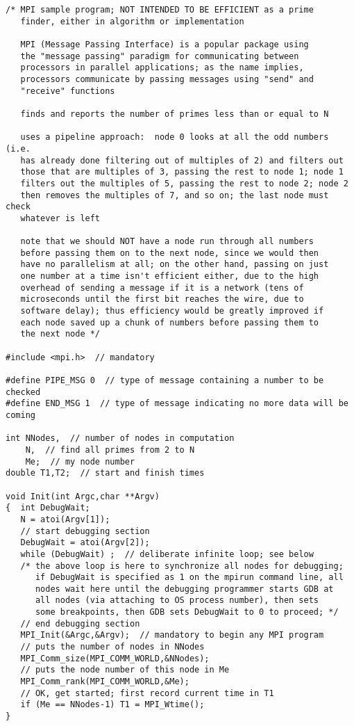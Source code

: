 \begin{Verbatim}
/* MPI sample program; NOT INTENDED TO BE EFFICIENT as a prime
   finder, either in algorithm or implementation

   MPI (Message Passing Interface) is a popular package using
   the "message passing" paradigm for communicating between
   processors in parallel applications; as the name implies,
   processors communicate by passing messages using "send" and
   "receive" functions

   finds and reports the number of primes less than or equal to N

   uses a pipeline approach:  node 0 looks at all the odd numbers (i.e.
   has already done filtering out of multiples of 2) and filters out
   those that are multiples of 3, passing the rest to node 1; node 1
   filters out the multiples of 5, passing the rest to node 2; node 2
   then removes the multiples of 7, and so on; the last node must check
   whatever is left

   note that we should NOT have a node run through all numbers
   before passing them on to the next node, since we would then
   have no parallelism at all; on the other hand, passing on just
   one number at a time isn't efficient either, due to the high
   overhead of sending a message if it is a network (tens of
   microseconds until the first bit reaches the wire, due to
   software delay); thus efficiency would be greatly improved if
   each node saved up a chunk of numbers before passing them to
   the next node */

#include <mpi.h>  // mandatory

#define PIPE_MSG 0  // type of message containing a number to be checked
#define END_MSG 1  // type of message indicating no more data will be coming

int NNodes,  // number of nodes in computation
    N,  // find all primes from 2 to N
    Me;  // my node number
double T1,T2;  // start and finish times

void Init(int Argc,char **Argv)
{  int DebugWait;
   N = atoi(Argv[1]);
   // start debugging section
   DebugWait = atoi(Argv[2]);
   while (DebugWait) ;  // deliberate infinite loop; see below
   /* the above loop is here to synchronize all nodes for debugging;
      if DebugWait is specified as 1 on the mpirun command line, all
      nodes wait here until the debugging programmer starts GDB at
      all nodes (via attaching to OS process number), then sets
      some breakpoints, then GDB sets DebugWait to 0 to proceed; */
   // end debugging section
   MPI_Init(&Argc,&Argv);  // mandatory to begin any MPI program
   // puts the number of nodes in NNodes
   MPI_Comm_size(MPI_COMM_WORLD,&NNodes);
   // puts the node number of this node in Me
   MPI_Comm_rank(MPI_COMM_WORLD,&Me);
   // OK, get started; first record current time in T1
   if (Me == NNodes-1) T1 = MPI_Wtime();
}


\end{Verbatim}
